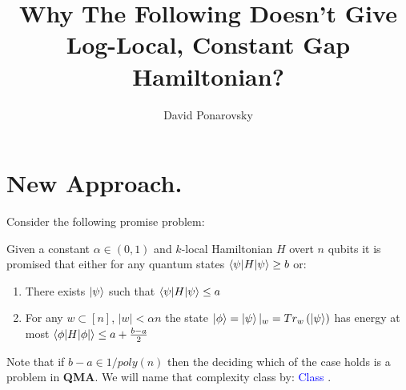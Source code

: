 \documentclass[manuscript,screen,review]{acmart}
\begin{document}


\title{Why The Following Doesn't Give Log-Local, Constant Gap Hamiltonian?} 
\author{David Ponarovsky}

\ifdefined\ACM
\else
  \maketitle
\fi
%
\ifdefined\ACM
  \maketitle
\fi

\newcommand{\Hin}{H_{\text{init}}}
  \newcommand{\Hpr}{H_{\text{prop}}}
\newcommand{\Hen}{H_{\text{end}}}

\newcommand{\CLASS}{\textcolor{blue}{Class }}


\section{New Approach.}

Consider the following promise problem: 

\begin{definition}
  \label{def:class}
  Given a constant $\alpha\in (0,1)$ and $k$-local Hamiltonian $H$ overt $n$ qubits it is promised that either for any quantum states $\braket{\psi|H|\psi} \ge b$ or:\begin{enumerate}
    \item There exists $\ket{\psi}$ such that $\braket{\psi|H|\psi} \le a$
    \item For any $w\subset [n]$, $|w| < \alpha n $ the state $\ket{\phi} = \ket{\psi}|_{w} = Tr_{w}\left( \ket{\psi} \right)$ has energy at most $\braket{\phi|H|\phi|} \le a + \frac{b-a}{2}$
  \end{enumerate}
  Note that if $b-a \in 1/poly(n)$ then the deciding which of the case holds is a problem in \textbf{QMA}. We will name that complexity class by: \CLASS. 
\end{definition}
\end{document}
